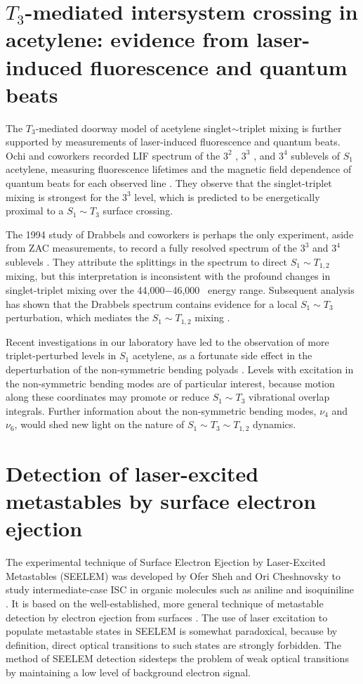 \documentclass[12pt]{mitthesis}
\begin{document}
\section{$T_3$-mediated intersystem crossing in acetylene: evidence
  from laser-induced fluorescence and quantum beats}

The $T_3$-mediated doorway model of acetylene singlet$\sim$triplet
mixing is further supported by measurements of laser-induced
fluorescence and quantum beats.  Ochi and coworkers recorded LIF
spectrum of the $3^2$ , $3^3$ , and $3^4$  sublevels
of $S_1$ acetylene, measuring fluorescence lifetimes and the magnetic
field dependence of quantum beats for each observed line
\cite{ochi91}.  They observe that the singlet-triplet mixing is
strongest for the $3^3$  level, which is predicted to be
energetically proximal to a $S_1 \sim T_3$ surface crossing.

The 1994 study of Drabbels and coworkers is perhaps the only
experiment, aside from ZAC measurements, to record a fully resolved
spectrum of the $3^3$  and $3^4$  sublevels
\cite{drabbels94}.  They attribute the splittings in the spectrum to
direct $S_1 \sim T_{1,2}$ mixing, but this interpretation is
inconsistent with the profound changes in singlet-triplet mixing over
the 44,000$-$46,000 \rcm\ energy range.  Subsequent analysis has shown
that the Drabbels spectrum contains evidence for a local $S_1 \sim
T_3$ perturbation, which mediates the $S_1 \sim T_{1,2}$ mixing
\cite{altunata01}.

Recent investigations in our laboratory have led to the observation of
more triplet-perturbed levels in $S_1$ acetylene, as a fortunate side
effect in the deperturbation of the non-symmetric bending polyads
\cite{merer08, steeves08}.  Levels with excitation in the
non-symmetric bending modes are of particular interest, because motion
along these coordinates may promote or reduce $S_1 \sim T_3$
vibrational overlap integrals.  Further information about the
non-symmetric bending modes, $\nu_4$ and $\nu_6$, would shed new light
on the nature of $S_1 \sim T_3 \sim T_{1,2}$ dynamics.

\section{Detection of laser-excited metastables by surface electron
  ejection}

The experimental technique of Surface Electron Ejection by
Laser-Excited Metastables (SEELEM) was developed by Ofer Sheh and Ori
Cheshnovsky to study intermediate-case ISC in organic molecules such
as aniline and isoquiniline \cite{sneh86, sneh88, sneh89a, sneh89b,
  sneh91}.  It is based on the well-established, more general
technique of metastable detection by electron ejection from surfaces
\cite{hotop96}.  The use of laser excitation to populate metastable
states in SEELEM is somewhat paradoxical, because by definition,
direct optical transitions to such states are strongly forbidden.  The
method of SEELEM detection sidesteps the problem of weak optical
transitions by maintaining a low level of background electron signal.
\end{document}
